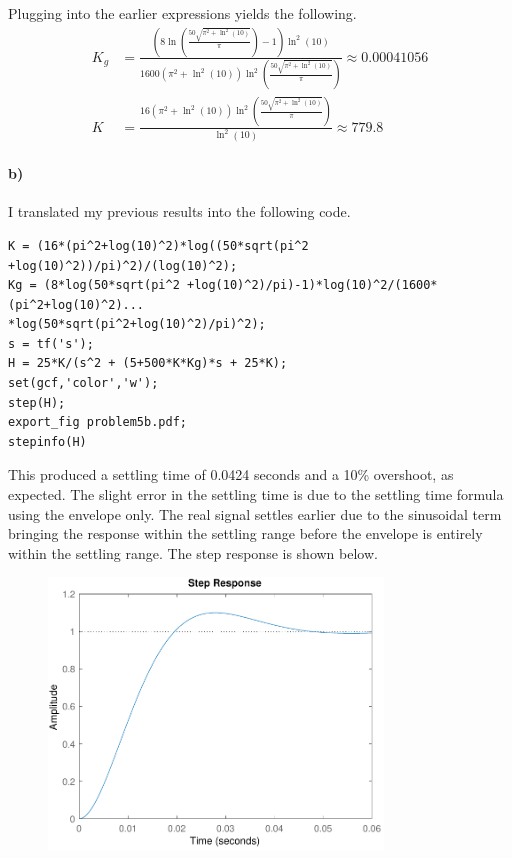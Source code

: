 \documentclass[12pt]{article}
\begin{document}
Plugging into the earlier expressions yields the following.
\begin{align*}
    K_g&=\frac{\left(8\ln\left(\frac{50\sqrt{\pi^2 +\ln^2(10)}}{\pi}\right)-1\right)\ln^2(10)}{1600(\pi^2 +\ln^2(10))\ln^2\left(\frac{50\sqrt{\pi^2 +\ln^2(10)}}{\pi}\right)}\approx 0.00041056\\
    K&=\frac{16(\pi^2 +\ln^2(10)) \ln^2\left(\frac{50\sqrt{\pi^2 +\ln^2(10)}}{\pi}\right)}{\ln^2(10)}\approx 779.8
\end{align*}

\paragraph{b)}

I translated my previous results into the following code.
\scriptsize
\begin{verbatim}
K = (16*(pi^2+log(10)^2)*log((50*sqrt(pi^2 +log(10)^2))/pi)^2)/(log(10)^2);
Kg = (8*log(50*sqrt(pi^2 +log(10)^2)/pi)-1)*log(10)^2/(1600*(pi^2+log(10)^2)...
*log(50*sqrt(pi^2+log(10)^2)/pi)^2);
s = tf('s');
H = 25*K/(s^2 + (5+500*K*Kg)*s + 25*K);
set(gcf,'color','w');
step(H);
export_fig problem5b.pdf;
stepinfo(H)
\end{verbatim}
\normalsize
This produced a settling time of 0.0424 seconds and a 10\% overshoot, as expected. The slight error in the
settling time is due to the settling time formula using the envelope only. The real signal settles earlier
due to the sinusoidal term bringing the response within the settling range before the envelope is entirely
within the settling range. The step response is shown below.
\begin{figure}[H]
    \begin{center}
        \includegraphics[width=3.5in]{problem5b.pdf}
    \end{center}
\end{figure}
\end{document}
